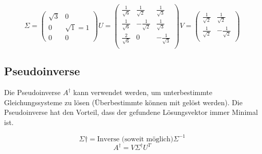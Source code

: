\[\Sigma = \begin{pmatrix}
	\sqrt{3} & 0 \\
	0 & \sqrt{1} = 1 \\
	0 & 0
\end{pmatrix}
 U = \begin{pmatrix}
	\frac{1}{\sqrt{6}} & \frac{1}{\sqrt{2}} & \frac{1}{\sqrt{3}} \\
	\frac{1}{\sqrt{6}} & -\frac{1}{\sqrt{2}} & \frac{1}{\sqrt{3}} \\
	\frac{2}{\sqrt{6}} & 0 & -\frac{1}{\sqrt{3}} \\
\end{pmatrix}
 V = \begin{pmatrix}
	\frac{1}{\sqrt{2}} & \frac{1}{\sqrt{2}} \\
	\frac{1}{\sqrt{2}} & -\frac{1}{\sqrt{2}}  \\
\end{pmatrix}
\]

\subsection{Pseudoinverse}
Die Pseudoinverse $A^{\dagger}$ kann verwendet werden, um unterbestimmte Gleichungssysteme zu lösen (Überbestimmte können mit  gelöst werden). Die Pseudoinverse hat den Vorteil, dass der gefundene Lösungsvektor immer Minimal ist.


\[\Sigma{\dagger} = \text{Inverse (soweit möglich)} \Sigma^{-1}\]
\[A^{\dagger} = V\Sigma^{\dagger}U^T\]